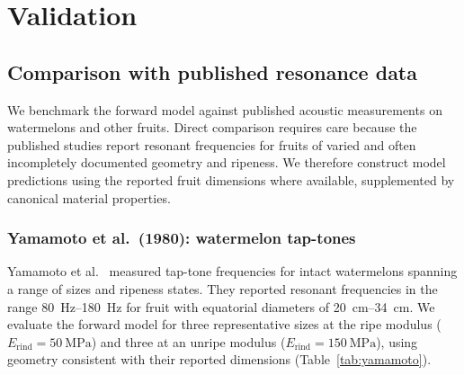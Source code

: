 \section{Validation}
\label{sec:validation}

\subsection{Comparison with published resonance data}
\label{sec:published_data}

We benchmark the forward model against published acoustic measurements
on watermelons and other fruits.  Direct comparison requires care because
the published studies report resonant frequencies for fruits of varied
and often incompletely documented geometry and ripeness.  We therefore
construct model predictions using the reported fruit dimensions where
available, supplemented by canonical material properties.

\subsubsection{Yamamoto et al.\ (1980): watermelon tap-tones}

Yamamoto et al.~\cite{Yamamoto1980} measured tap-tone frequencies for
intact watermelons spanning a range of sizes and ripeness states.  They
reported resonant frequencies in the range
\SIrange{80}{180}{\hertz} for fruit with equatorial diameters of
\SIrange{20}{34}{\centi\metre}.  We evaluate the forward model for
three representative sizes at the ripe modulus
($E_{\mathrm{rind}} = \SI{50}{\mega\pascal}$) and three at an
unripe modulus ($E_{\mathrm{rind}} = \SI{150}{\mega\pascal}$),
using geometry consistent with their reported dimensions
(Table~\ref{tab:yamamoto}).

